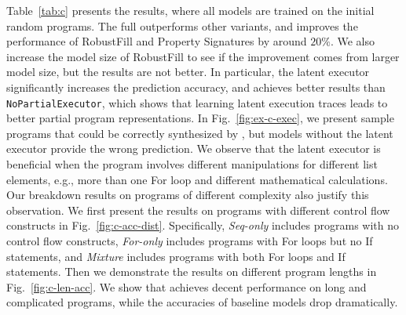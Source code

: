 Table~\ref{tab:c} presents the results, where all models are trained on the initial random programs. The full {\ours} outperforms other variants, and improves the performance of RobustFill and Property Signatures by around $20\%$. We also increase the model size of RobustFill to see if the improvement comes from larger model size, but the results are not better. In particular, the latent executor significantly increases the prediction accuracy, and achieves better results than \texttt{NoPartialExecutor}, which shows that learning latent execution traces leads to better partial program representations. In Fig.~\ref{fig:ex-c-exec}, we present sample programs that could be correctly synthesized by {\ours}, but models without the latent executor provide the wrong prediction. We observe that the latent executor is beneficial when the program involves different manipulations for different list elements, e.g., more than one For loop and different mathematical calculations. Our breakdown results on programs of different complexity also justify this observation. We first present the results on programs with different control flow constructs in Fig.~\ref{fig:c-acc-dist}. Specifically, \emph{Seq-only} includes programs with no control flow constructs, \emph{For-only} includes programs with For loops but no If statements, and \emph{Mixture} includes programs with both For loops and If statements. Then we demonstrate the results on different program lengths in Fig.~\ref{fig:c-len-acc}. We show that {\ours} achieves decent performance on long and complicated programs, while the accuracies of baseline models drop dramatically.   

\vspace{-0.1em}
